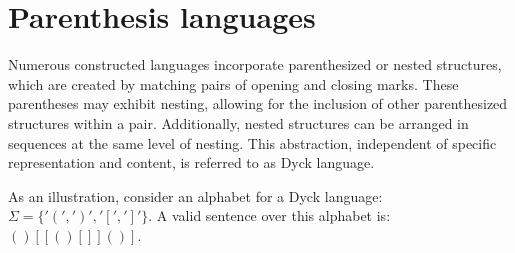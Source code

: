 \section{Parenthesis languages}

Numerous constructed languages incorporate parenthesized or nested structures, which are created by matching pairs of opening and closing marks.
These parentheses may exhibit nesting, allowing for the inclusion of other parenthesized structures within a pair.
Additionally, nested structures can be arranged in sequences at the same level of nesting.
This abstraction, independent of specific representation and content, is referred to as Dyck language.
\begin{example}
    As an illustration, consider an alphabet for a Dyck language: $\Sigma=\{\prime(\prime,\prime)\prime,\prime[\prime,\prime]\prime\}$. 
    A valid sentence over this alphabet is: $()[[()[]]()]$.
\end{example}
